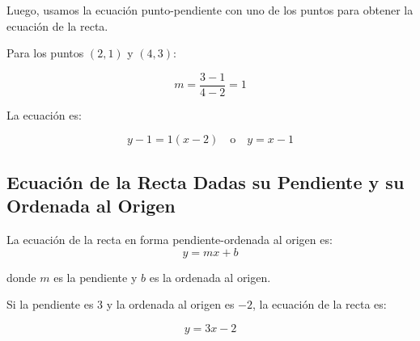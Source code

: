 Luego, usamos la ecuación punto-pendiente con uno de los puntos para obtener la ecuación de la recta.

\begin{example}
Para los puntos \((2, 1)\) y \((4, 3)\):

\[
m = \frac{3 - 1}{4 - 2} = 1
\]

La ecuación es:

\[
y - 1 = 1(x - 2) \quad \text{o} \quad y = x - 1
\]

\begin{center}
\end{center}
\end{example}

\subsection{Ecuación de la Recta Dadas su Pendiente y su Ordenada al Origen}

La ecuación de la recta en forma pendiente-ordenada al origen es:
\begin{equation}
    y = mx + b
\end{equation}

donde \(m\) es la pendiente y \(b\) es la ordenada al origen.

\begin{example}
    Si la pendiente es \(3\) y la ordenada al origen es \(-2\), la ecuación de la recta es:

\[
y = 3x - 2
\]

\begin{center}
\end{center}
\end{example}

